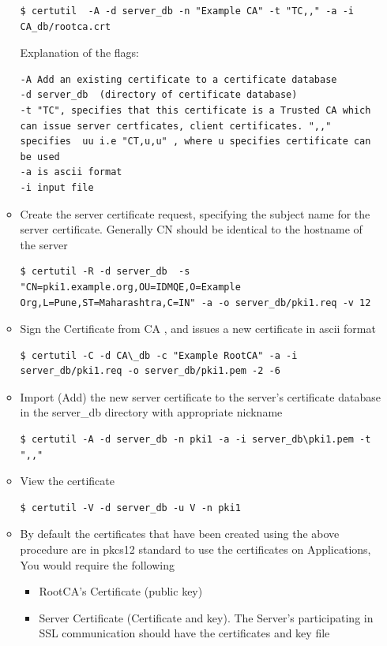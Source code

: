 \documentclass[a4paper]{article}
\begin{document}
\begin{enumerate}[label*=\arabic*.]
\begin{itemize}
                \begin{lstlisting}[style=BashInputStyle]
$ certutil  -A -d server_db -n "Example CA" -t "TC,," -a -i CA_db/rootca.crt
                \end{lstlisting}
            Explanation of the flags:
                \begin{lstlisting}
-A Add an existing certificate to a certificate database
-d server_db  (directory of certificate database)
-t "TC", specifies that this certificate is a Trusted CA which can issue server certficates, client certificates. ",," specifies  uu i.e "CT,u,u" , where u specifies certificate can be used
-a is ascii format
-i input file
                \end{lstlisting}
            \item Create the server certificate request, specifying the subject name for the server certificate. Generally CN should be identical to the hostname of the server
                \begin{lstlisting}[style=BashInputStyle]
$ certutil -R -d server_db  -s "CN=pki1.example.org,OU=IDMQE,O=Example Org,L=Pune,ST=Maharashtra,C=IN" -a -o server_db/pki1.req -v 12
                \end{lstlisting}
            \item Sign the Certificate from CA , and  issues a  new certificate in ascii format

                \begin{lstlisting}[style=BashInputStyle]
$ certutil -C -d CA\_db -c "Example RootCA" -a -i server_db/pki1.req -o server_db/pki1.pem -2 -6
                \end{lstlisting}

            \item Import (Add) the new server certificate to the server's certificate database in the server\_db directory with appropriate nickname
                 \begin{lstlisting}[style=BashInputStyle]
$ certutil -A -d server_db -n pki1 -a -i server_db\pki1.pem -t ",,"
                 \end{lstlisting}

            \item View the certificate
                \begin{lstlisting}[style=BashInputStyle]
$ certutil -V -d server_db -u V -n pki1
                \end{lstlisting}

            \item By default the certificates that have been created using the above procedure are in pkcs12 standard to use the certificates on Applications,  You would require the following
                \begin{itemize}
                    \item RootCA's Certificate (public key)
                    \item Server Certificate (Certificate and key). The Server's participating in SSL communication should have the certificates and key file
                \end{itemize}


\end{itemize}
\end{enumerate}
\end{document}
